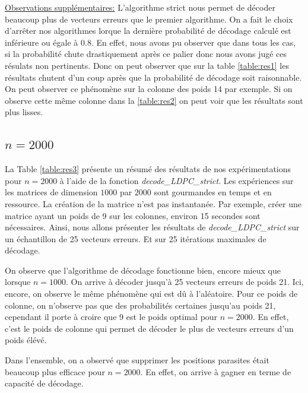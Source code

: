 \documentclass[french,nochapter,11pt]{rapportUB}
\begin{document}
\underline{Observations supplémentaires:} L'algorithme strict nous permet de décoder beaucoup plus de vecteurs erreurs que le premier algorithme. On a fait le choix d'arrêter nos algorithmes
lorque la dernière probabilité de décodage calculé est inférieure ou égale à 0.8. En effet, nous avons pu observer que dans tous les cas, si la probabilité chute drastiquement
après ce palier donc nous avons jugé ces résulats non pertinents. Donc on peut observer que sur la table \ref{table:res1} les résultats chutent d'un coup après que la probabilité de décodage soit 
raisonnable. On peut observer ce phénomène sur la colonne des poids 14 par exemple. Si on observe cette même colonne dans la \ref{table:res2} on peut voir que les résultats sont plus lisses.

\subsection{$n = 2000$}
La Table \ref{table:res3} présente un résumé des résultats de nos expérimentations pour $n=2000$ à l'aide de la fonction
\textit{decode\_LDPC\_strict}.\vspace{0.4cm}\newline
Les expériences sur les matrices de dimension $1000$ par $2000$ sont gourmandes en temps et en ressource. La création de la matrice n'est pas instantanée. Par exemple, créer une matrice ayant un poids de 9 sur les colonnes, environ 15 secondes sont nécessaires. 
Ainsi, nous allons présenter 
les résultats de \textit{decode\_LDPC\_strict} sur un échantillon de 25 vecteurs erreurs. Et sur 25 itérations maximales de décodage.\vspace{0.4cm}\newline

On observe que l'algorithme de décodage fonctionne bien, encore mieux que lorsque $n=1000$. On arrive à décoder jusqu'à 25 vecteurs erreurs de poids 21. Ici, encore, on observe le même phénomène qui est 
dû à l'aléatoire. Pour ce poids de colonne, on n'observe pas que des probabilités certaines jusqu'au poids 21, cependant il porte à croire que 9 est le poids optimal pour 
$n = 2000$. En effet, c'est le poids de colonne qui permet de décoder le plus de vecteurs erreurs d'un poids élévé.\vspace{0.4cm}\newline


Dans l'ensemble, on a observé que supprimer les positions parasites était beaucoup plus efficace pour $n=2000$. En effet, on arrive à gagner en terme de capacité de décodage.
\end{document}
